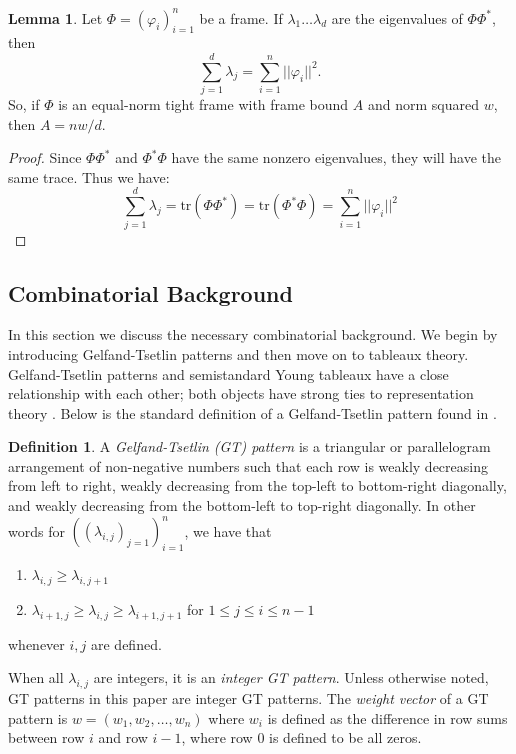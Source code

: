 \documentclass[10pt]{article}
\theoremstyle{plain}
\theoremstyle{definition}
\newtheorem{definition}[thm]{Definition}
\newtheorem{lem}[thm]{Lemma}
\renewcommand{\phi}{\varphi}
\begin{document}
\begin{lem}\label{lem:sumnorm}
Let $\Phi=(\varphi_i)_{i=1}^n$ be a frame. If $\lambda_1 \dots \lambda_d$ are the eigenvalues of $\Phi\Phi^\ast$, then $$ \sum^d_{j=1} \lambda_j = \sum^n_{i=1} ||\phi_i||^2.$$
So, if $\Phi$ is an equal-norm tight frame with frame bound $A$ and norm squared $w$, then $A=nw/d$.
\end{lem}

\begin{proof}
Since $\Phi\Phi^\ast$ and $\Phi^\ast\Phi$ have the same nonzero eigenvalues, they will have the same trace. Thus we have: 
$$\sum^d_{j=1} \lambda_j = \text{tr}(\Phi\Phi^\ast) = \text{tr}(\Phi^\ast\Phi) = \sum^n_{i=1} ||\phi_i||^2 $$
\end{proof}

\subsection{Combinatorial Background}\label{combinatorialbackground}
In this section we discuss the necessary combinatorial background. We begin by introducing Gelfand-Tsetlin patterns and then move on to tableaux theory. Gelfand-Tsetlin patterns and semistandard Young tableaux have a close relationship with each other; both objects have strong ties to representation theory \cite{CrystalBases, RepTheory, HKGTcrystals}. Below is the standard definition of a Gelfand-Tsetlin pattern found in \cite{Stanleycombinatorics, GTpatterns, HKGTcrystals}. \\

\begin{definition}\label{GTdef}
A \emph{Gelfand-Tsetlin (GT) pattern} is a triangular or parallelogram arrangement of non-negative numbers such that each row is weakly decreasing from left to right, weakly decreasing from the top-left to bottom-right diagonally, and weakly decreasing from the bottom-left to top-right diagonally. In other words for $((\lambda_{i,j})_{j=1})_{i=1}^n$, we have that
\begin{enumerate}
\item $\lambda_{i,j} \geq \lambda_{i,j+1}$
\item $ \lambda_{i+1,j} \geq \lambda_{i,j} \geq \lambda_{i+1,j+1}$ for $1 \leq j \leq i \leq n-1$
\end{enumerate}
whenever $i,j$ are defined.

When all $\lambda_{i,j}$ are integers, it is an \emph{integer GT pattern}.  Unless otherwise noted, GT patterns in this paper are integer GT patterns. The \emph{weight vector} of a GT pattern is $w = (w_1, w_2, \dots, w_n)$ where $w_i$ is defined as the difference in row sums between row $i$ and row $i-1$, where row $0$ is defined to be all zeros.
\end{definition}
\end{document}
